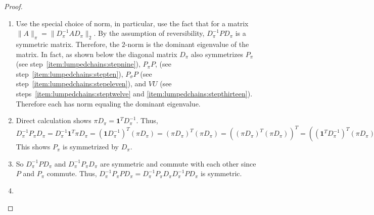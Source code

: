 \documentclass[12pt]{article}
\begin{document}
\begin{proof}
\begin{enumerate}
\begin{align*}
                & \qquad = \|(P_{\pi}+P_{\sigma}P)^\nu(P_{\sigma}H-P_{\sigma}P)
                (P_{\pi}+P_{\sigma}H)^{n-1-\nu}\|_{\pi} \\
                & \qquad = \|(P_{\sigma}P)^\nu(P_{\sigma}H-P_{\sigma}P)
                (P_ {\sigma}H)^{n-1-\nu}\|_{\pi} \\
                & \qquad = \| P_{\sigma} P \|_{\pi}^\nu \cdot \delta
                \cdot \|P_{\sigma}H\|_ {\pi}^{n-\nu-1}.
            \end{align*}
        \item
            Use the special choice of norm, in particular, use the fact
            that for a matrix \( \| A \|_{\pi} = \| D_{\pi}^{-1} A D_{\pi}
            \|_{2} \).  By the assumption of reversibility, \( D_{\pi}^{-1}
            P D_{\pi} \) is a symmetric matrix.  Therefore, the \( 2 \)-norm
            is the dominant eigenvalue of the matrix.  In fact, as shown
            below the diagonal matrix \( D_{\pi} \) also symmetrizes
            \( P_{\pi} \) (see step~\ref{item:lumpedchains:stepnine}),
            \( P_{\pi}P \), (see step~\ref{item:lumpedchains:stepten}),
            \( P_{\sigma}P \) (see step~\ref{item:lumpedchains:stepeleven}),
            and \( VU \) (see steps~\ref{item:lumpedchains:steptwelve}
            and \ref{item:lumpedchains:stepthirteen}).
            Therefore each has norm equaling the dominant eigenvalue.
        \item \label{item:lumpedchains:stepnine}
            Direct calculation shows \( \pi D_{\pi} = \mathbf{1}^T D_{\pi}^
            {-1} \).  Thus, \( D_{\pi}^{-1} P_{\pi} D_{\pi} = D_{\pi}^{-1}
            \mathbf{1}^{T} \pi D_{\pi} = (\mathbf{1} D_{\pi}^{-1})^T(\pi
            D_{\pi}) = (\pi D_{\pi})^T(\pi D_{\pi}) = ( (\pi D_{\pi})^T(\pi
            D_{\pi}))^T = ( (\mathbf{1}^T D_{\pi}^{-1})^T (\pi D_{\pi}))
            = (  (D_{\pi}^{-1} \mathbf{1}) (\pi D_{\pi}))^T
            = (  (D_{\pi}^{-1} (\mathbf{1}) \pi ) D_{\pi})^T
            = (D_{\pi}^{-1} P_{\pi} D_{\pi})^T \)  This
            shows \( P_{\pi} \) is symmetrized by \( D_{\pi} \).
        \item \label{item:lumpedchains:stepten}
            So \( D_{\pi}^{-1} P D_{\pi} \) and \( D_{\pi}^{-1} P_{\pi}
            D_{\pi} \) are symmetric and commute with each other since \(
            P \) and \( P_{\pi} \) commute.  Thus, \( D_{\pi}^{-1} P_{\pi}
            P D_{\pi} = D_{\pi}^{-1} P_{\pi} D_{\pi} D_{\pi}^{-1} P D_{\pi}
            \) is symmetric.
        \item \label{item:lumpedchains:stepeleven}

\end{enumerate}
\end{proof}
\end{document}
